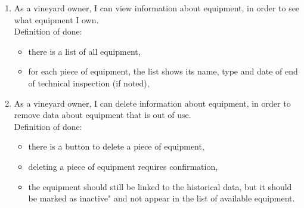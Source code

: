 \begin{enumerate}
\begin{itemize}
		\item there is a button to edit an existing piece of equipment next to each piece of equipment on the list,
		\item the form for adding/editing a piece of equipment includes fields for the name and type selector,
		\item there is option to note date of end of technical inspection,
	\end{itemize}
	\item As a vineyard owner, I can view information about equipment, in order to see what equipment I own.
	\\Definition of done:
	\begin{itemize}
		\item there is a list of all equipment,
		\item for each piece of equipment, the list shows its name, type and date of end of technical inspection (if noted),
	\end{itemize}
	\item As a vineyard owner, I can delete information about equipment, in order to remove data about equipment that is out of use.
	\\Definition of done:
	\begin{itemize}
		\item there is a button to delete a piece of equipment,
		\item deleting a piece of equipment requires confirmation,
		\item the equipment should still be linked to the historical data, but it should be marked as inactive" and not appear in the list of available equipment.
	\end{itemize}


\end{enumerate}

